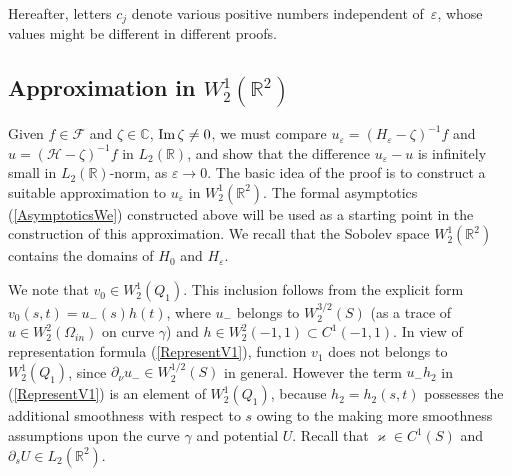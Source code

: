 \documentclass[graybox]{svmult}
\renewcommand{\Im}{\mathop{\rm Im}}
\renewcommand{\kappa}{\varkappa}
\newcommand{\Real}{\mathbb R}
\newcommand{\Cmpl}{\mathbb C}
\newcommand{\eps}{\varepsilon}
\newcommand{\cF}{\mathcal{F}}
\newcommand{\eqref}[1]{(\ref{#1})}
\begin{document}
Hereafter, letters $c_j$ denote various posi\-ti\-ve numbers independent of~$\eps$, whose values might be different in different proofs.




\subsection{Approximation in $W_2^1(\Real^2)$}

Given $f\in \cF$ and $\zeta\in \Cmpl$, $\Im \zeta \neq 0$, we must compare $u_\eps=(H_\eps-\zeta)^{-1}f$ and $u=(\mathcal{H}-\zeta)^{-1}f$ in $L_2(\Real)$, and show that the difference $u_\eps-u$ is infinitely small in $L_2(\Real)$-norm, as $\eps\to 0$.
The basic idea of the proof is to construct a suitable approximation to $u_\eps$ in  $W_2^1(\Real^2)$.
The formal asymptotics \eqref{AsymptoticsWe} constructed above  will be used as a starting point in the construction of this approximation.
We recall that the Sobolev space $W_2^1(\Real^2)$ contains the domains
of $H_0$ and $H_\eps$.


We note that $v_0\in W_2^1(Q_1)$. This inclusion follows from the explicit form $v_0(s,t)=u_-(s)h(t)$, where  $u_-$ belongs to
$W_2^{3/2}(S)$ (as a trace of $u\in W_2^2(\Omega_{in})$  on curve  $\gamma$) and $h\in W_2^2(-1,1)\subset C^1(-1,1)$.
In view of representation formula \eqref{RepresentV1}, function $v_1$ does not belongs to $W_2^1(Q_1)$, since $\partial_\nu u_-\in W_2^{1/2}(S)$ in general.  However the term $u_- h_2$ in \eqref{RepresentV1} is an element of $W_2^1(Q_1)$, because $h_2=h_2(s,t)$ possesses the additional smoothness with respect to $s$ owing to the making more smoothness assumptions upon the curve $\gamma$ and potential $U$. Recall that $\kappa\in C^1(S)$ and $\partial_s U\in L_2(\Real^2)$.
\end{document}
